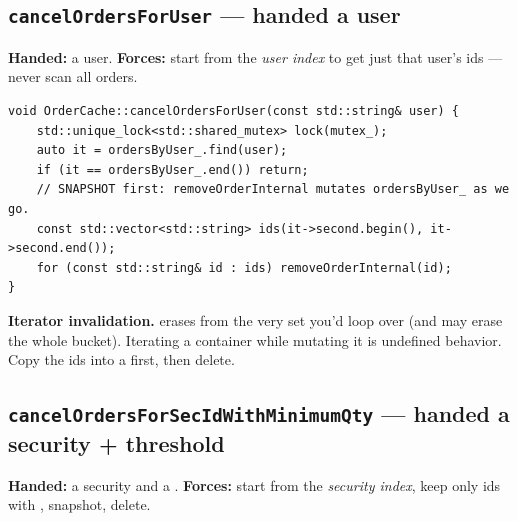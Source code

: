 \subsection{\texttt{cancelOrdersForUser} --- handed a user}

\textbf{Handed:} a user. \textbf{Forces:} start from the \emph{user index} to get
just that user's ids --- never scan all orders.

\begin{center}
\end{center}

\begin{lstlisting}
void OrderCache::cancelOrdersForUser(const std::string& user) {
    std::unique_lock<std::shared_mutex> lock(mutex_);
    auto it = ordersByUser_.find(user);
    if (it == ordersByUser_.end()) return;
    // SNAPSHOT first: removeOrderInternal mutates ordersByUser_ as we go.
    const std::vector<std::string> ids(it->second.begin(), it->second.end());
    for (const std::string& id : ids) removeOrderInternal(id);
}
\end{lstlisting}

\begin{pitfall}
\textbf{Iterator invalidation.}  erases from the very set
you'd loop over (and may erase the whole bucket). Iterating a container while
mutating it is undefined behavior. Copy the ids into a  first, then
delete.
\end{pitfall}

\subsection{\texttt{cancelOrdersForSecIdWithMinimumQty} --- handed a security + threshold}

\textbf{Handed:} a security and a . \textbf{Forces:} start from the
\emph{security index}, keep only ids with , snapshot, delete.

